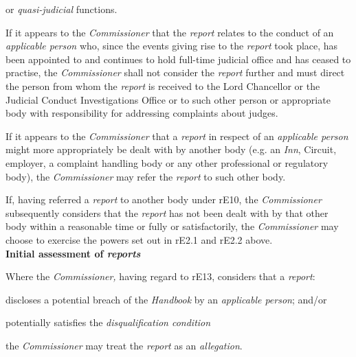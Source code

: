 or \emph{quasi-judicial} functions.\\
\par
{}\par
If it appears to the \emph{Commissioner} that the \emph{report} relates
to the conduct of an \emph{applicable person} who, since the events
giving rise to the \emph{report} took place, has been appointed to and
continues to hold full-time judicial office and has ceased to practise,
the \emph{Commissioner} shall not consider the \emph{report} further and
must direct the person from whom the \emph{report} is received to the
Lord Chancellor or the Judicial Conduct Investigations Office or to such
other person or appropriate body with responsibility for addressing
complaints about judges.\\
\par
{}\par
If it appears to the \emph{Commissioner} that a \emph{report} in respect
of an \emph{applicable person} might more appropriately be dealt with by
another body (e.g. an \emph{Inn}, Circuit, employer, a complaint
handling body or any other professional or regulatory body),
the \emph{Commissioner} may refer the \emph{report} to such other
body.\\
\par
If, having referred a \emph{report} to another body under rE10,
the \emph{Commissioner} subsequently considers that
the \emph{report }has not been dealt with by that other body within a
reasonable time or fully or satisfactorily, the \emph{Commissioner} may
choose to exercise the powers set out in rE2.1 and rE2.2 above.\\
\textbf{Initial assessment of \emph{reports}}\par
{}\par
Where the \emph{Commissioner, }having regard to rE13, considers that
a \emph{report}:\\\nl \item discloses a potential breach of the \emph{Handbook }by
an \emph{applicable person}; and/or\item potentially satisfies the \emph{disqualification condition}\par
the \emph{Commissioner} may treat the \emph{report} as
an \emph{allegation}.\ln
{}\par
